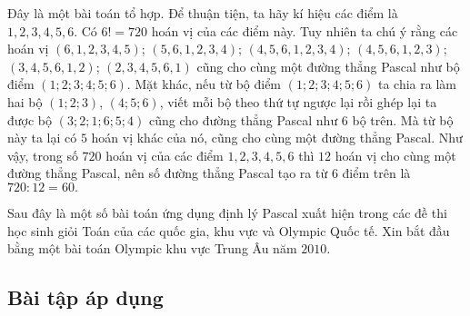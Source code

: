 \begin{itemize}
	Đây là một bài toán tổ hợp. Để thuận tiện, ta hãy kí hiệu các điểm là $1, 2, 3, 4, 5, 6$. Có $6! = 720$ hoán vị của các điểm này. Tuy nhiên ta chú ý rằng các hoán vị $(6, 1, 2, 3, 4, 5)$; $(5, 6, 1, 2, 3, 4)$; $(4, 5, 6, 1, 2, 3, 4)$; $(4, 5, 6, 1, 2, 3)$; $(3, 4, 5, 6, 1, 2)$; $(2, 3, 4, 5, 6, 1)$ cũng cho cùng một đường thẳng Pascal như bộ điểm $(1; 2; 3; 4; 5; 6)$. Mặt khác, nếu từ bộ điểm $(1; 2; 3; 4; 5; 6)$ ta chia ra làm hai bộ $(1; 2; 3)$, $(4; 5; 6)$, viết mỗi bộ theo thứ tự ngược lại rồi ghép lại ta được bộ $(3; 2; 1; 6; 5; 4)$ cũng cho đường thẳng Pascal như $6$ bộ trên. Mà từ bộ này ta lại có $5$ hoán vị khác của nó, cũng cho cùng một đường thẳng Pascal. Như vậy, trong số $720$ hoán vị của các điểm $1, 2, 3, 4, 5, 6$ thì $12$ hoán vị cho cùng một đường thẳng Pascal, nên số đường thẳng Pascal tạo ra từ $6$ điểm trên là $720: 12 = 60.$
	
	Sau đây là một số bài toán ứng dụng định lý Pascal xuất hiện trong các đề thi học sinh giỏi Toán của các quốc gia, khu vực và Olympic Quốc tế. Xin bắt đầu bằng một bài toán Olympic khu vực Trung Âu năm $2010.$

\end{itemize}


\subsection{Bài tập áp dụng}

